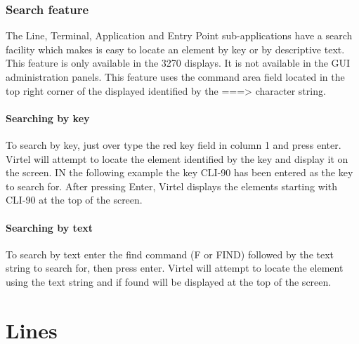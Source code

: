 \documentclass[letterpaper,10pt,english]{sphinxmanual}
\begin{document}
\subsection{Search feature}
\label{\detokenize{connectivity_guide:search-feature}}
The Line, Terminal, Application and Entry Point sub-applications have a search facility which makes is easy to locate an element by key or by descriptive text. This feature is only available in the 3270 displays. It is not available in the GUI administration panels. This feature uses the command area field located in the top right corner of the displayed identified by the ===\textgreater{} character string.




\subsubsection{Searching by key}
\label{\detokenize{connectivity_guide:searching-by-key}}
To search by key, just over type the red key field in column 1 and press enter. Virtel will attempt to locate the element identified by the key and display it on the screen. IN the following example the key CLI-90 has been entered as the key to search for. After pressing Enter, Virtel displays the elements starting with CLI-90 at the top of the screen.



\subsubsection{Searching by text}
\label{\detokenize{connectivity_guide:searching-by-text}}
To search by text enter the find command (F or FIND) followed by the text string to search for, then press enter. Virtel will attempt to locate the element using the text string and if found will be displayed at the top of the screen.


\ignorespaces 

\chapter{Lines}
\label{\detokenize{connectivity_guide:lines}}\label{\detokenize{connectivity_guide:index-4}}
\end{document}
